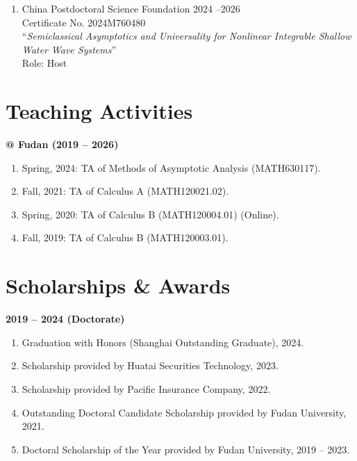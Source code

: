 \documentclass[margin]{res}
\begin{document}
\begin{resume}
\begin{enumerate}[--]
\item China Postdoctoral Science Foundation  \hfill 2024 --2026\\
Certificate No. 2024M760480\\
``{\sl Semiclassical Asymptotics and Universality for Nonlinear Integrable Shallow Water Wave Systems}'' \\
Role: Host
\end{enumerate}



\section{Teaching Activities}
\textbf{@ Fudan (2019 -- 2026)}
\begin{enumerate}[--]
\item Spring, 2024: TA of Methods of Asymptotic Analysis (MATH630117).
\item Fall, 2021: TA of Calculus A (MATH120021.02).
\item Spring, 2020: TA of Calculus B (MATH120004.01) (Online).
\item Fall, 2019: TA of Calculus B (MATH120003.01).
\end{enumerate}


\section{Scholarships \& Awards}
\textbf{2019 -- 2024 (Doctorate)}
\begin{enumerate}[--]
    \item Graduation with Honors (Shanghai Outstanding Graduate), 2024.
    \item Scholarship provided by Huatai Securities Technology, 2023.
    \item Scholarship provided by Pacific Insurance Company, 2022. 
    \item Outstanding Doctoral Candidate Scholarship provided by Fudan University, 2021. 
    \item Doctoral Scholarship of the Year provided by Fudan University, 2019 -- 2023. 
\end{enumerate}


\end{resume}
\end{document}
